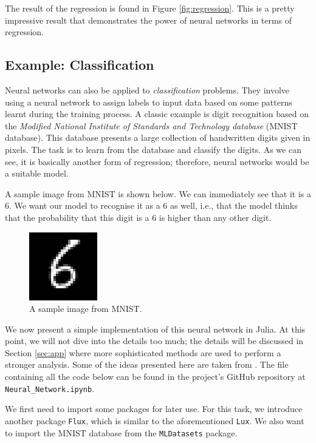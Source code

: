 \documentclass[a4paper,11pt,titlepage]{article}
\theoremstyle{definition}
\theoremstyle{plain}
\theoremstyle{remark}
\begin{document}
The result of the regression is found in Figure \ref{fig:regression}. This is a pretty impressive result that demonstrates the power of neural networks in terms of regression.

\subsection{Example: Classification}
\label{sec:cla}

Neural networks can also be applied to \textit{classification} problems. They involve using a neural network to assign labels to input data based on some patterns learnt during the training process. A classic example is digit recognition based on the \textit{Modified National Institute of Standards and Technology database} (MNIST database). This database presents a large collection of handwritten digits given in pixels. The task is to learn from the database and classify the digits. As we can see, it is basically another form of regression; therefore, neural networks would be a suitable model.

A sample image from MNIST is shown below. We can immediately see that it is a $6$. We want our model to recognise it as a $6$ as well, i.e., that the model thinks that the probability that this digit is a $6$ is higher than any other digit.

\begin{figure}[htbp]
    \centering
    \includegraphics{report/figures/6.png}
    \caption{A sample image from MNIST.}
    \label{fig:6}
\end{figure}

We now present a simple implementation of this neural network in Julia. At this point, we will not dive into the details too much; the details will be discussed in Section \ref{sec:app} where more sophisticated methods are used to perform a stronger analysis. Some of the ideas presented here are taken from \cite{Piotr}. The file containing all the code below can be found in the project's GitHub repository at \verb|Neural_Network.ipynb|.

We first need to import some packages for later use. For this task, we introduce another package \verb|Flux|, which is similar to the aforementioned \verb|Lux|. We also want to import the MNIST database from the \verb|MLDatasets| package.
\end{document}
